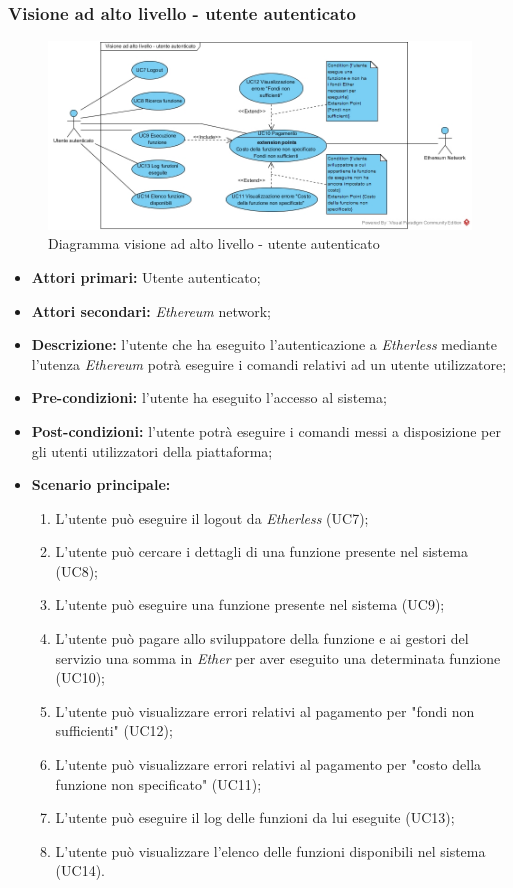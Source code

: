 \subsubsection{Visione ad alto livello - utente autenticato}
\begin{figure}[h]
	\centering
	\includegraphics[width=\linewidth]{res/img/utenteAutenticato.jpg}
	\caption{Diagramma visione ad alto livello - utente autenticato}
\end{figure}
\begin{itemize}
	\item \textbf{Attori primari:} Utente autenticato;
	\item \textbf{Attori secondari:} \textit{Ethereum\glo} network;
	\item \textbf{Descrizione:} l'utente che ha eseguito l'autenticazione a \textit{Etherless} mediante l'utenza \textit{Ethereum\glo} potrà eseguire i comandi relativi ad un utente utilizzatore; 
	\item \textbf{Pre-condizioni:} l'utente ha eseguito l'accesso al sistema; 
	\item \textbf{Post-condizioni:} l'utente potrà eseguire i comandi messi a disposizione per gli utenti utilizzatori della piattaforma;
	\item \textbf{Scenario principale:} 
	\begin{enumerate}
		\item L'utente può eseguire il logout da \textit{Etherless} (UC7);
		\item L'utente può cercare i dettagli di una funzione presente nel sistema (UC8);
		\item L'utente può eseguire una funzione presente nel sistema (UC9);
		\item L'utente può pagare allo sviluppatore della funzione e ai gestori del servizio una somma in \textit{Ether\glo} per aver eseguito una determinata funzione (UC10);
		\item L'utente può visualizzare errori relativi al pagamento per "fondi non sufficienti" (UC12);
		\item L'utente può visualizzare errori relativi al pagamento per "costo della funzione non specificato" (UC11);
		\item L'utente può eseguire il log delle funzioni da lui eseguite (UC13);
		\item L'utente può visualizzare l'elenco delle funzioni disponibili nel sistema (UC14).
	\end{enumerate}
\end{itemize}